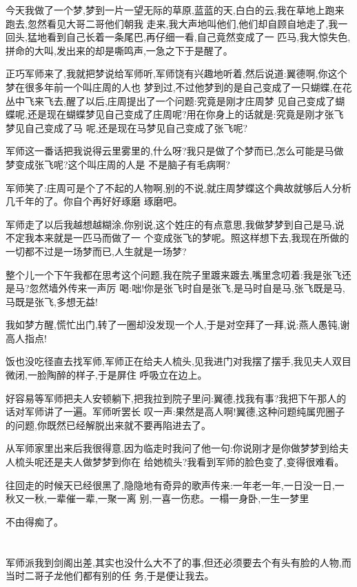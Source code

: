 ﻿\documentclass[12pt,twocolumn]{article}
\begin{document}
今天我做了一个梦,梦到一片一望无际的草原,蓝蓝的天,白白的云,我在草地上跑来跑去,忽然看见大哥二哥他们朝我
走来,我大声地叫他们,他们却自顾自地走了,我一回头,猛地看到自己长着一条尾巴,再仔细一看,自己竟然变成了一
匹马,我大惊失色,拼命的大叫,发出来的却是嘶鸣声,一急之下于是醒了。

正巧军师来了,我就把梦说给军师听,军师饶有兴趣地听着,然后说道:翼德啊,你这个梦在很多年前一个叫庄周的人也
梦到过,不过他梦到的是自己变成了一只蝴蝶,在花丛中飞来飞去,醒了以后,庄周提出了一个问题:究竟是刚才庄周梦
见自己变成了蝴蝶呢,还是现在蝴蝶梦见自己变成了庄周呢?用在你身上的话就是:究竟是刚才张飞梦见自己变成了马
呢,还是现在马梦见自己变成了张飞呢?

军师这一番话把我说得云里雾里的,什么呀?我只是做了个梦而已,怎么可能是马做梦变成张飞呢?这个叫庄周的人是
不是脑子有毛病啊?

军师笑了:庄周可是个了不起的人物啊,别的不说,就庄周梦蝶这个典故就够后人分析几千年的了。你自个再好好琢磨
琢磨吧。

军师走了以后我越想越糊涂,你别说,这个姓庄的有点意思,我做梦梦到自己是马,说不定我本来就是一匹马而做了一
个变成张飞的梦呢。照这样想下去,我现在所做的一切都不过是一场梦而已,人生就是一场梦?

整个儿一个下午我都在思考这个问题,我在院子里踱来踱去,嘴里念叨着:我是张飞还是马?忽然墙外传来一声厉
喝:咄!你是张飞时自是张飞,是马时自是马,张飞既是马,马既是张飞,多想无益!

我如梦方醒,慌忙出门,转了一圈却没发现一个人,于是对空拜了一拜,说:燕人愚钝,谢高人指点!

饭也没吃径直去找军师,军师正在给夫人梳头,见我进门对我摆了摆手,我见夫人双目微闭,一脸陶醉的样子,于是屏住
呼吸立在边上。

好容易等军师把夫人安顿躺下,把我拉到院子里问:翼德,找我有事?我把下午那人的话对军师讲了一遍。军师听罢长
叹一声:果然是高人啊!翼德,这种问题纯属兜圈子的问题,你既然已经解脱出来就不要再陷进去了。

从军师家里出来后我很得意,因为临走时我问了他一句:你说刚才是你做梦梦到给夫人梳头呢还是夫人做梦梦到你在
给她梳头?我看到军师的脸色变了,变得很难看。

往回走的时候天已经很黑了,隐隐地有奇异的歌声传来:一年老一年,一日没一日,一秋又一秋,一辈催一辈,一聚一离
别,一喜一伤悲。一榻一身卧,一生一梦里\dldots

不由得痴了。

\section{}

军师派我到剑阁出差,其实也没什么大不了的事,但还必须要去个有头有脸的人物,而当时二哥子龙他们都有别的任
务,于是便让我去。
\end{document}
